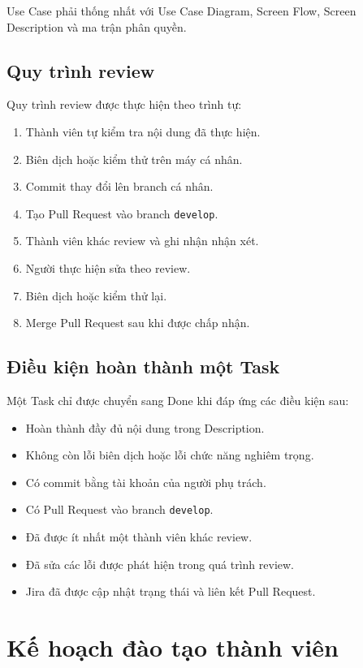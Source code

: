 Use Case phải thống nhất với Use Case Diagram, Screen Flow, Screen
Description và ma trận phân quyền.

\subsection{Quy trình review}

Quy trình review được thực hiện theo trình tự:

\begin{enumerate}
	\item Thành viên tự kiểm tra nội dung đã thực hiện.
	\item Biên dịch hoặc kiểm thử trên máy cá nhân.
	\item Commit thay đổi lên branch cá nhân.
	\item Tạo Pull Request vào branch \texttt{develop}.
	\item Thành viên khác review và ghi nhận nhận xét.
	\item Người thực hiện sửa theo review.
	\item Biên dịch hoặc kiểm thử lại.
	\item Merge Pull Request sau khi được chấp nhận.
\end{enumerate}

\subsection{Điều kiện hoàn thành một Task}

Một Task chỉ được chuyển sang Done khi đáp ứng các điều kiện sau:

\begin{itemize}
	\item Hoàn thành đầy đủ nội dung trong Description.
	\item Không còn lỗi biên dịch hoặc lỗi chức năng nghiêm trọng.
	\item Có commit bằng tài khoản của người phụ trách.
	\item Có Pull Request vào branch \texttt{develop}.
	\item Đã được ít nhất một thành viên khác review.
	\item Đã sửa các lỗi được phát hiện trong quá trình review.
	\item Jira đã được cập nhật trạng thái và liên kết Pull Request.
\end{itemize}

\section{Kế hoạch đào tạo thành viên}

